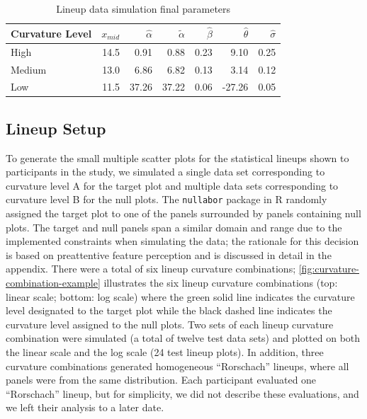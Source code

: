 \documentclass[12pt]{article}
\begin{document}
\begin{table}

\caption{\label{tab:parameter-data}Lineup data simulation final parameters}
\centering
\begin{tabular}[t]{lrrrrrr}
\toprule
Curvature Level & $x_{mid}$ & $\hat\alpha$ & $\tilde\alpha$ & $\hat\beta$ & $\hat\theta$ & $\hat\sigma$\\
\midrule
High & 14.5 & 0.91 & 0.88 & 0.23 & 9.10 & 0.25\\
Medium & 13.0 & 6.86 & 6.82 & 0.13 & 3.14 & 0.12\\
Low & 11.5 & 37.26 & 37.22 & 0.06 & -27.26 & 0.05\\
\bottomrule
\end{tabular}
\end{table}

\hypertarget{lineup-setup}{%
\subsection{Lineup Setup}\label{lineup-setup}}

To generate the small multiple scatter plots for the statistical lineups
shown to participants in the study, we simulated a single data set
corresponding to curvature level A for the target plot and multiple data
sets corresponding to curvature level B for the null plots. The
\texttt{nullabor} package in R \citep{buja_statistical_2009} randomly
assigned the target plot to one of the panels surrounded by panels
containing null plots. The target and null panels span a similar domain
and range due to the implemented constraints when simulating the data;
the rationale for this decision is based on preattentive feature
perception \citep{wolfeWhatPreattentiveFeature2019} and is discussed in
detail in the appendix. There were a total of six lineup curvature
combinations; \cref{fig:curvature-combination-example} illustrates the
six lineup curvature combinations (top: linear scale; bottom: log scale)
where the green solid line indicates the curvature level designated to
the target plot while the black dashed line indicates the curvature
level assigned to the null plots. Two sets of each lineup curvature
combination were simulated (a total of twelve test data sets) and
plotted on both the linear scale and the log scale (24 test lineup
plots). In addition, three curvature combinations generated homogeneous
``Rorschach'' lineups, where all panels were from the same distribution.
Each participant evaluated one ``Rorschach'' lineup, but for simplicity,
we did not describe these evaluations, and we left their analysis to a
later date.
\end{document}
